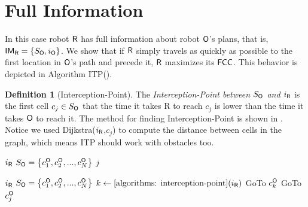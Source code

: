 \documentclass[a4paper,11pt]{article}
\theoremstyle{definition}
\newtheorem{definition}{Definition}[section]
\newcommand{\rob}{{{\sf R}}\xspace}
\newcommand{\opp}{{{\sf O}}\xspace}
\newcommand{\fcc}{{{\sf{FCC}}}\xspace}
\newcommand{\IM}{{{\sf{IM}}}\xspace}
\newcommand{\itp}{{{\textsf{ITP}}}\xspace}
\begin{document}
\section{Full Information}
In this case robot $\rob$ has full information about robot $\opp$'s plans, that is, $\IM_{\rob}=\lbrace S_{\opp},i_{\opp}\rbrace$. We show that if $\rob$ simply travels as quickly as possible to the first location in $\opp$'s path and precede it, $\rob$  maximizes its $\fcc$. This behavior is depicted in Algorithm \itp (). 

\begin{definition}[Interception-Point]
The {\em Interception-Point between $S_{\opp}$ and $i_{\rob}$} is the first cell $c_j\in S_{\opp}$ that the time it takes \rob to reach $c_j$ is lower than the time it takes $\opp$ to reach it. 
The method for finding Interception-Point is shown in . 
Notice we used Dijkstra($i_\rob$,$c_j$)\cite{dijkstra1959note} to compute the distance between cells in the graph, which means \itp should work with obstacles too.
\end{definition}
\begin{algorithm}
    \begin{algorithmic}
        \REQUIRE $i_\rob$
        \REQUIRE  $S_{\opp}=\left\{c_1^{\opp},c_2^{\opp},...,c_N^{\opp}\right\}$
            \IF {Dijkstra $(i_\rob,c_j)$ $<j$}
                \RETURN $j$
            \ENDIF
        \ENDFOR
    \end{algorithmic}
\caption{Finding Interception-Point}\label{algorithms: interception-point}
\end{algorithm}

\begin{algorithm}
\begin{algorithmic}
    \REQUIRE $i_\rob$
    \REQUIRE $S_{\opp}=\left\{c_1^{\opp},c_2^{\opp},...,c_N^{\opp}\right\}$
	\STATE $k \leftarrow \Cref{algorithms: interception-point}(i_\rob)$
    \STATE GoTo $c^{\opp}_{k}$
        \STATE GoTo $c^{\opp}_j$
    \ENDFOR
\end{algorithmic}
\caption{Intercept Then Precede (\itp)\label{algorithms: Intercept-then-Precede}}
\end{algorithm}
\end{document}
